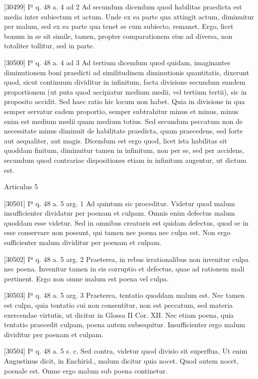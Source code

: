 \documentclass[10pt]{jsarticle} %
\begin{document}
[30499] Iª q. 48 a. 4 ad 2 Ad secundum dicendum quod habilitas praedicta est media inter subiectum et actum. Unde ex ea parte qua attingit actum, diminuitur per malum, sed ex ea parte qua tenet se cum subiecto, remanet. Ergo, licet bonum in se sit simile, tamen, propter comparationem eius ad diversa, non totaliter tollitur, sed in parte.

[30500] Iª q. 48 a. 4 ad 3 Ad tertium dicendum quod quidam, imaginantes diminutionem boni praedicti ad similitudinem diminutionis quantitatis, dixerunt quod, sicut continuum dividitur in infinitum, facta divisione secundum eandem proportionem (ut puta quod accipiatur medium medii, vel tertium tertii), sic in proposito accidit. Sed haec ratio hic locum non habet. Quia in divisione in qua semper servatur eadem proportio, semper subtrahitur minus et minus, minus enim est medium medii quam medium totius. Sed secundum peccatum non de necessitate minus diminuit de habilitate praedicta, quam praecedens, sed forte aut aequaliter, aut magis. Dicendum est ergo quod, licet ista habilitas sit quoddam finitum, diminuitur tamen in infinitum, non per se, sed per accidens, secundum quod contrariae dispositiones etiam in infinitum augentur, ut dictum est.

Articulus 5

[30501] Iª q. 48 a. 5 arg. 1 Ad quintum sic proceditur. Videtur quod malum insufficienter dividatur per poenam et culpam. Omnis enim defectus malum quoddam esse videtur. Sed in omnibus creaturis est quidam defectus, quod se in esse conservare non possunt, qui tamen nec poena nec culpa est. Non ergo sufficienter malum dividitur per poenam et culpam.

[30502] Iª q. 48 a. 5 arg. 2 Praeterea, in rebus irrationalibus non invenitur culpa nec poena. Invenitur tamen in eis corruptio et defectus, quae ad rationem mali pertinent. Ergo non omne malum est poena vel culpa.

[30503] Iª q. 48 a. 5 arg. 3 Praeterea, tentatio quoddam malum est. Nec tamen est culpa, quia tentatio cui non consentitur, non est peccatum, sed materia exercendae virtutis, ut dicitur in Glossa II Cor. XII. Nec etiam poena, quia tentatio praecedit culpam, poena autem subsequitur. Insufficienter ergo malum dividitur per poenam et culpam.

[30504] Iª q. 48 a. 5 s. c. Sed contra, videtur quod divisio sit superflua. Ut enim Augustinus dicit, in Enchirid., malum dicitur quia nocet. Quod autem nocet, poenale est. Omne ergo malum sub poena continetur.
\end{document}

